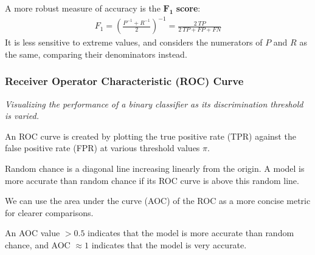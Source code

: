 A more robust measure of accuracy is the $\mathbf{F_1}$ \textbf{score}:
\begin{align*}
    F_1 = \left( \frac{P^{-1} + R^{-1}}{2} \right)^{-1} =
        \frac{2\:TP}{2\:TP + FP + FN}
\end{align*}
It is less sensitive to extreme values, and considers the numerators of $P$ and $R$ as the same,
comparing their denominators instead.

\subsubsection{Receiver Operator Characteristic (ROC) Curve}
\emph{Visualizing the performance of a binary classifier as its discrimination threshold is varied.}

An ROC curve is created by plotting the true positive rate (TPR) against the
false positive rate (FPR) at various threshold values $\pi$.

Random chance is a diagonal line increasing linearly from the origin. A model is more accurate
than random chance if its ROC curve is above this random line.

We can use the area under the curve (AOC) of the ROC as a more concise metric for clearer comparisons.

An AOC value $> 0.5$ indicates that the model is more accurate than random chance,
and AOC $\approx 1$ indicates that the model is very accurate.